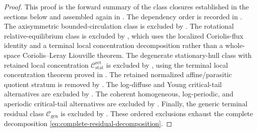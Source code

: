 \documentclass[11pt]{amsart}
\numberwithin{equation}{section}
\theoremstyle{plain}
\theoremstyle{definition}
\theoremstyle{remark}
\newcommand{\Cstat}{\mathcal C_{\mathrm{stat}}^{\mathrm{ret}}}
\newcommand{\Cgen}{\mathcal C_{\mathrm{gen}}}
\begin{document}
\begin{proof}
This proof is the forward summary of the class closures established in the
sections below and assembled again in .  The
dependency order is recorded in .
The axisymmetric bounded-circulation class is excluded by
.  The rotational relative-equilibrium class is excluded by
, which uses the localized Coriolis-flux identity
and a terminal local concentration decomposition rather than a whole-space
Coriolis--Leray Liouville theorem.
The degenerate stationary-hull class with retained local concentration
\(\Cstat\) is excluded by , using the
terminal local concentration theorem proved in
.
The retained normalized affine/parasitic quotient stratum is removed by
.  The log-diffuse and Young
critical-tail alternatives are excluded by
.
The coherent homogeneous, log-periodic, and aperiodic critical-tail alternatives are
excluded by .  Finally, the
generic terminal residual class \(\Cgen\) is excluded by
.  These ordered exclusions exhaust the complete
decomposition \eqref{eq:complete-residual-decomposition}.
\end{proof}
\end{document}
